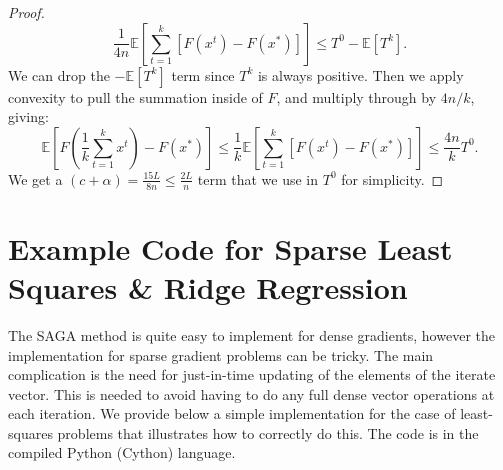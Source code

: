 \documentclass{article}
\begin{document}
\begin{proof}
\[
\frac{1}{4n}\mathbb{E}\left[\sum_{t=1}^{k}\left[F(x^{t})-F(x^{*})\right]\right]  \leq  T^{0}-\mathbb{E}[T^{k}].
\]
We can drop the $-\mathbb{E}\left[T^{k}\right]$ term since $T^{k}$ is
always positive. Then we apply convexity to pull the summation inside
of $F$, and multiply through by $4n/k$, giving:
\[
\mathbb{E}\left[F(\frac{1}{k}\sum_{t=1}^{k}x^{t})-F(x^{*})\right]
\leq \frac{1}{k}\mathbb{E}\left[\sum_{t=1}^{k}\left[F(x^{t})-F(x^{*})\right]\right]
\leq \frac{4n}{k}T^{0}.
\]
We get a $(c+\alpha) = \frac{15L}{8n} \leq \frac{2L}{n}$ term that we use in $T^{0}$ for simplicity.
\end{proof}

\section{Example Code for Sparse Least Squares \& Ridge Regression}
The SAGA method is quite easy to implement for dense gradients, however the implementation for sparse gradient problems can be tricky.
The main complication is the need for just-in-time updating of the elements of the iterate vector. This is needed to avoid having
to do any full dense vector operations at each iteration.
We provide below a simple implementation for the case of least-squares problems that illustrates how to correctly do this. The code is in the compiled Python (Cython) language.
\end{document}
